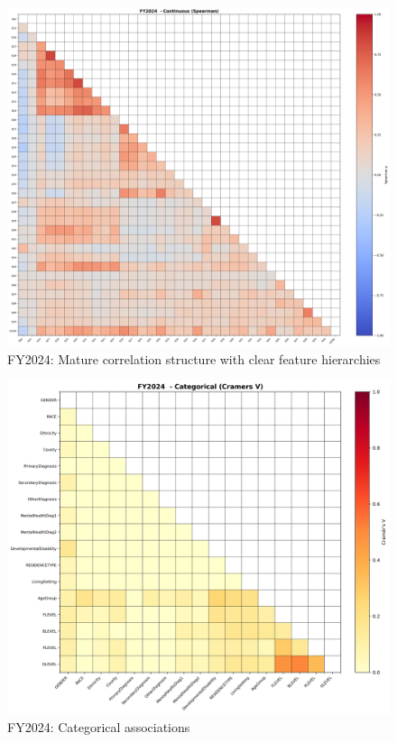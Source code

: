 \vspace*{\fill}
\begin{figure}[htbp]
\centering
\includegraphics[width=\textwidth]{fy2024_continuous_spearman.png}
\caption{FY2024: Mature correlation structure with clear feature hierarchies}
\end{figure}
\vspace*{\fill}

\newpage

\vspace*{\fill}
\begin{figure}[htbp]
\centering
\includegraphics[width=\textwidth]{fy2024_categorical_cramers_v.png}
\caption{FY2024: Categorical associations}
\end{figure}
\vspace*{\fill}

